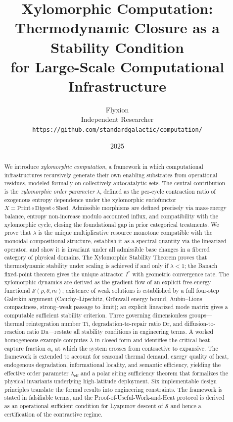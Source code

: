 \documentclass[10pt,twocolumn]{article}
\title{\Large\bfseries Xylomorphic Computation:\\
Thermodynamic Closure as a Stability Condition\\
for Large-Scale Computational Infrastructure}
\author{%
  Flyxion\\
  \small Independent Researcher\\
  \small\texttt{https://github.com/standardgalactic/computation/}
}
\date{2025}
\theoremstyle{plain}
\theoremstyle{definition}
\theoremstyle{remark}
\begin{document}
\maketitle

\begin{abstract}
We introduce \emph{xylomorphic computation}, a framework in which
computational infrastructures recursively generate their own enabling
substrates from operational residues, modeled formally on collectively
autocatalytic sets. The central contribution is the \emph{xylomorphic
order parameter} $\lambda$, defined as the per-cycle contraction ratio
of exogenous entropy dependence under the xylomorphic endofunctor
$X = \mathrm{Print} \circ \mathrm{Digest} \circ \mathrm{Shed}$.
Admissible morphisms are defined precisely via mass-energy balance,
entropy non-increase modulo accounted influx, and compatibility with
the xylomorphic cycle, closing the foundational gap in prior categorical
treatments. We prove that $\lambda$ is the unique multiplicative
resource monotone compatible with the monoidal compositional structure,
establish it as a spectral quantity via the linearized operator, and
show it is invariant under all admissible base changes in a fibered
category of physical domains. The Xylomorphic Stability Theorem proves
that thermodynamic stability under scaling is achieved if and only if
$\lambda < 1$; the Banach fixed-point theorem gives the unique attractor
$I^*$ with geometric convergence rate. The xylomorphic dynamics are
derived as the gradient flow of an explicit free-energy functional
$\mathcal{S}(\rho,\theta,m)$; existence of weak solutions is established
by a full four-step Galerkin argument (Cauchy--Lipschitz, Grönwall
energy bound, Aubin--Lions compactness, strong--weak passage to limit);
an explicit linearized mode matrix gives a computable sufficient
stability criterion. Three governing dimensionless groups---thermal
reintegration number $\mathrm{Ti}$, degradation-to-repair ratio
$\mathrm{Dr}$, and diffusion-to-reaction ratio $\mathrm{Da}$---restate
all stability conditions in engineering terms. A worked homogeneous
example computes $\lambda$ in closed form and identifies the critical
heat-capture fraction $\alpha_c$ at which the system crosses from
contractive to expansive. The framework is extended to account for
seasonal thermal demand, exergy quality of heat, endogenous
degradation, informational locality, and semantic efficiency, yielding
the effective order parameter $\lambda_{\mathrm{eff}}$ and a polar
siting sufficiency theorem that formalizes the physical invariants
underlying high-latitude deployment. Six implementable design
principles translate the formal results into engineering constraints.
The framework is stated in falsifiable terms, and the
Proof-of-Useful-Work-and-Heat protocol is derived as an operational
sufficient condition for Lyapunov descent of $\mathcal{S}$ and hence
a certification of the contractive regime.
\end{abstract}
\end{document}
